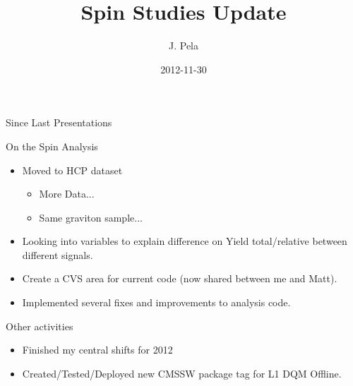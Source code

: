 \documentclass[8pt]{beamer}
\author[João Pela]{J. Pela}
\title[Spin Studies Update]{Spin Studies Update}
\institute{Imperial College London}
\date{2012-11-30}
\begin{document}
\setlength{\unitlength}{1mm}

\begin{frame}
  \titlepage
\end{frame}

\begin{frame}{Since Last Presentations}

  \begin{block}{On the Spin Analysis}
    
    \begin{itemize}
      \item Moved to HCP dataset
      \begin{itemize}
        \item More Data...
        \item Same graviton sample...
      \end{itemize}
      \item Looking into variables to explain difference on Yield total/relative between different signals. 
      \item Create a CVS area for current code (now shared between me and Matt).
      \item Implemented several fixes and improvements to analysis code.
    \end{itemize}

  \end{block}

  \begin{block}{Other activities}
  
    \begin{itemize}
      \item Finished my central shifts for 2012
      \item Created/Tested/Deployed new CMSSW package tag for L1 DQM Offline.
    \end{itemize}

  \end{block}

\end{frame}
\end{document}
